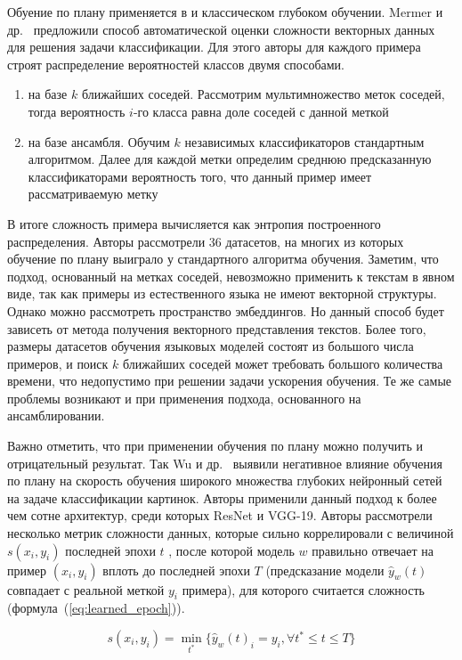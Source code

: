 \documentclass{spbau-diploma}
\begin{document}
Обуение по плану применяется в и классическом глубоком обучении. Mermer и др.~\cite{mermer2017scalable} предложили способ автоматической оценки сложности векторных данных для решения задачи классификации. Для этого авторы для каждого примера строят распределение вероятностей классов двумя способами.
\begin{enumerate}
	\item на базе $k$ ближайших соседей. Рассмотрим мультимножество меток соседей, тогда вероятность $i$-го класса равна доле соседей с данной меткой
	\item на базе ансамбля. Обучим $k$ независимых классификаторов стандартным алгоритмом. Далее для каждой метки определим среднюю предсказанную классификаторами вероятность того, что данный пример имеет рассматриваемую метку
\end{enumerate}
	
В итоге сложность примера вычисляется как энтропия построенного распределения. Авторы рассмотрели $36$ датасетов, на многих из которых обучение по плану выиграло у стандартного алгоритма обучения. Заметим, что подход, основанный на метках соседей, невозможно применить к текстам в явном виде, так как примеры из естественного языка не имеют векторной структуры. Однако можно рассмотреть пространство эмбеддингов. Но данный способ будет зависеть от метода получения векторного представления текстов. Более того, размеры датасетов обучения языковых моделей состоят из большого числа примеров, и поиск $k$ ближайших соседей может требовать большого количества времени, что недопустимо при решении задачи ускорения обучения. Те же самые проблемы возникают и при применения подхода, основанного на ансамблировании.

Важно отметить, что при применении обучения по плану можно получить и отрицательный результат. Так Wu и др.~\cite{wu2020curricula} выявили негативное влияние обучения по плану на скорость обучения широкого множества глубоких нейронный сетей на задаче классификации картинок. Авторы применили данный подход к более чем сотне архитектур, среди которых ResNet и VGG-19. Авторы рассмотрели несколько метрик сложности данных, которые сильно коррелировали с величиной $s(x_i, y_i)$ последней эпохи $t$	, после которой модель $w$ правильно отвечает на пример $(x_i, y_i)$ вплоть до последней эпохи $T$ (предсказание модели $\hat{y}_w(t)$ совпадает с реальной меткой $y_i$ примера), для которого считается сложность (формула~(\ref{eq:learned_epoch})). 

\begin{equation} \label{eq:learned_epoch}
s(x_i, y_i) = \min_{t^*}\{\hat{y}_w(t)_i = y_i,\forall t^* \le t \le T\}
\end{equation}
\end{document}
